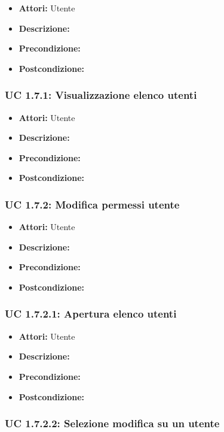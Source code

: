 \begin{itemize}
\item \textbf{Attori:} Utente
\item \textbf{Descrizione:} 
\item \textbf{Precondizione:} 
\item \textbf{Postcondizione:} 
\end{itemize}

\subsubsection{UC 1.7.1: Visualizzazione elenco utenti}

\begin{itemize}
\item \textbf{Attori:} Utente
\item \textbf{Descrizione:} 
\item \textbf{Precondizione:} 
\item \textbf{Postcondizione:} 
\end{itemize}

\subsubsection{UC 1.7.2: Modifica permessi utente}

\begin{itemize}
\item \textbf{Attori:} Utente
\item \textbf{Descrizione:} 
\item \textbf{Precondizione:} 
\item \textbf{Postcondizione:} 
\end{itemize}

\subsubsection{UC 1.7.2.1: Apertura elenco utenti}

\begin{itemize}
\item \textbf{Attori:} Utente
\item \textbf{Descrizione:} 
\item \textbf{Precondizione:} 
\item \textbf{Postcondizione:} 
\end{itemize}

\subsubsection{UC 1.7.2.2: Selezione modifica su un utente}

